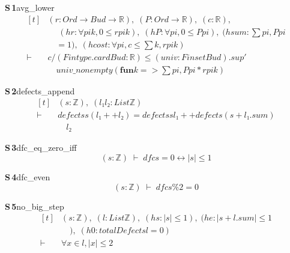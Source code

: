 \documentclass[conference]{IEEEtran}
\theoremstyle{definition}
\newcommand{\lean}[1]{\textsf{\footnotesize #1}}
\begin{document}
\noindent\textbf{S\,1}\quad\lean{avg\_lower}
{\footnotesize\[ \begin{aligned}[t]
&(\mathit{r} : \mathit{Ord} \to \mathit{Bud} \to \mathbb{R} ),\; (\mathit{P} : \mathit{Ord} \to \mathbb{R} ),\; (\mathit{c} : \mathbb{R} ),\\
&\quad \; (\mathit{hr} : \forall \mathit{pi} \mathit{k}, 0 \leq \mathit{r} \mathit{pi} \mathit{k}),\; (\mathit{hP} : \forall \mathit{pi}, 0 \leq \mathit{P} \mathit{pi}),\; (\mathit{hsum} : \textstyle\sum \mathit{pi}, \mathit{P} \mathit{pi}\\
&\quad = 1),\; (\mathit{hcost} : \forall \mathit{pi}, \mathit{c} \leq \textstyle\sum \mathit{k}, \mathit{r} \mathit{pi} \mathit{k})\\
\vdash\;&\mathit{c} / (\mathit{Fintype}.\mathit{card} \mathit{Bud} : \mathbb{R} ) \leq (\mathit{univ} : \mathit{Finset} \mathit{Bud}).\mathit{sup'}\\
&\quad \mathit{univ\_nonempty} (\mathbf{fun} \mathit{k} => \textstyle\sum \mathit{pi}, \mathit{P} \mathit{pi} * \mathit{r} \mathit{pi} \mathit{k})
\end{aligned} \]}

\noindent\textbf{S\,2}\quad\lean{defects\_append}
{\footnotesize\[ \begin{aligned}[t]
&(\mathit{s} : \mathbb{Z} ),\; (\mathit{l₁} \mathit{l₂} : \mathit{List} \mathbb{Z} )\\
\vdash\;&\mathit{defects} \mathit{s} (\mathit{l₁} ++ \mathit{l₂}) = \mathit{defects} \mathit{s} \mathit{l₁} ++ \mathit{defects} (\mathit{s} + \mathit{l₁}.\mathit{sum})\\
&\quad \mathit{l₂}
\end{aligned} \]}

\noindent\textbf{S\,3}\quad\lean{dfc\_eq\_zero\_iff}
{\footnotesize\[ (\mathit{s} : \mathbb{Z} ) \;\vdash\; \mathit{dfc} \mathit{s} = 0 \leftrightarrow |\mathit{s}| \leq 1 \]}

\noindent\textbf{S\,4}\quad\lean{dfc\_even}
{\footnotesize\[ (\mathit{s} : \mathbb{Z} ) \;\vdash\; \mathit{dfc} \mathit{s} \% 2 = 0 \]}

\noindent\textbf{S\,5}\quad\lean{no\_big\_step}
{\footnotesize\[ \begin{aligned}[t]
&(\mathit{s} : \mathbb{Z} ),\; (\mathit{l} : \mathit{List} \mathbb{Z} ),\; (\mathit{hs} : |\mathit{s}| \leq 1),\; (\mathit{he} : |\mathit{s} + \mathit{l}.\mathit{sum}| \leq 1\\
&\quad ),\; (\mathit{h0} : \mathit{totalDefect} \mathit{s} \mathit{l} = 0)\\
\vdash\;&\forall \mathit{x} \in \mathit{l}, |\mathit{x}| \leq 2
\end{aligned} \]}
\end{document}
